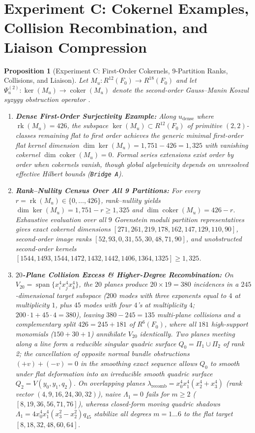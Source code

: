 \documentclass[11pt,a4paper]{amsart}
\newtheorem{proposition}[theorem]{Proposition}
\theoremstyle{definition}
\theoremstyle{remark}
\DeclareMathOperator{\rk}{rk}
\DeclareMathOperator{\coker}{coker}
\begin{document}
\section{Experiment C: Cokernel Examples, Collision Recombination, and Liaison Compression}
\label{sec:thmC}

\begin{proposition}[Experiment C: First-Order Cokernels, 9-Partition Ranks, Collisions, and Liaison]
\label{thm:C}
Let $M_u : R^{12}(F_0) \to R^{18}(F_0)$ and let $\Psi^{(2)}_u : \ker(M_u) \to \coker(M_u)$ denote the second-order Gauss--Manin Koszul syzygy obstruction operator \cite{Voisin2002}.
\begin{enumerate}[label=(\roman*)]
\item \textbf{Dense First-Order Surjectivity Example:} Along $u_{\mathrm{dense}}$ where $\rk(M_u) = 426$, the subspace $\ker(M_u) \subset R^{12}(F_0)$ of primitive $(2,2)$-classes remaining flat to first order achieves the generic minimal first-order flat kernel dimension $\dim\ker(M_u) = 1{,}751 - 426 = 1{,}325$ with vanishing cokernel $\dim \coker(M_u) = 0$. Formal series extensions exist order by order when cokernels vanish, though global algebraicity depends on unresolved effective Hilbert bounds (\texttt{Bridge~A}).
\item \textbf{Rank--Nullity Census Over All 9 Partitions:} For every $r = \rk(M_u) \in \{0, \dots, 426\}$, rank--nullity yields $\dim \ker(M_u) = 1,751 - r \ge 1,325$ and $\dim \coker(M_u) = 426 - r$. Exhaustive evaluation over all $9$ Gorenstein moduli partition representatives gives exact cokernel dimensions $[271, 261, 219, 178, 162, 147, 129, 110, 90]$, second-order image ranks $[52, 93, 0, 31, 55, 30, 48, 71, 90]$, and unobstructed second-order kernels $[1544, 1493, 1544, 1472, 1432, 1442, 1406, 1364, 1325] \ge 1,325$.
\item \textbf{$20$-Plane Collision Excess \& Higher-Degree Recombination:} On $V_{20} = \operatorname{span}\{x_i^4x_j^4x_k^4\}$, the $20$ planes produce $20 \times 19 = 380$ incidences in a $245$-dimensional target subspace ($200$ modes with three exponents equal to $4$ at multiplicity $1$, plus $45$ modes with four $4$'s at multiplicity $4$; $200\cdot 1 + 45\cdot 4 = 380$), leaving $380 - 245 = 135$ multi-plane collisions and a complementary split $426 = 245 + 181$ of $R^6(F_0)$, where all $181$ high-support monomials ($150 + 30 + 1$) annihilate $V_{20}$ identically. Two planes meeting along a line form a reducible singular quadric surface $Q_0 = \Pi_1 \cup \Pi_2$ of rank 2; the cancellation of opposite normal bundle obstructions $(+v) + (-v) = 0$ in the smoothing exact sequence allows $Q_0$ to smooth under flat deformation into an irreducible smooth quadric surface $Q_2 = V(y_0, y_1, q_2)$. On overlapping planes $\lambda_{\mathrm{recomb}} = x_0^4x_1^4(x_2^4 + x_3^4)$ (rank vector $(4,9,16,24,30,32)$), naive $\Lambda_1 = 0$ fails for $m \ge 2$ ($[8,19,36,56,71,76]$), whereas closed-form moving quadric shadows $\Lambda_1 = 4 x_0^4 x_1^4 (x_3^2 - x_2^2) q_{45}$ stabilize all degrees $m = 1 \dots 6$ to the flat target $[8,18,32,48,60,64]$.

\end{enumerate}
\end{proposition}
\end{document}
